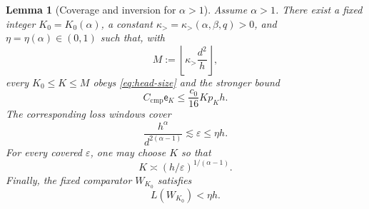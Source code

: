 \documentclass[11pt]{article}
\newtheorem{lemma}[lemma]{Lemma}
\theoremstyle{definition}
\newcommand{\eps}{\varepsilon}
\begin{document}
\begin{lemma}[Coverage and inversion for $\alpha>1$]
\label{lem:above-coverage}
Assume $\alpha>1$.  There exist a fixed integer $K_0=K_0(\alpha)$, a
constant $\kappa_>=\kappa_>(\alpha,\beta,q)>0$, and
$\eta=\eta(\alpha)\in(0,1)$ such that, with
\[
 M:=\left\lfloor\kappa_>\frac{d^2}{h}\right\rfloor,
\]
every $K_0\leq K\leq M$ obeys \eqref{eq:head-size} and the stronger
bound
\begin{equation}
 C_{\mathrm{cmp}}\mathsf e_K
 \leq\frac{c_0}{16}Kp_Kh.
 \label{eq:above-strong-admissible}
\end{equation}
The corresponding loss windows cover
\begin{equation}
 \frac{h^\alpha}{d^{2(\alpha-1)}}\lesssim\eps\leq\eta h.
 \label{eq:above-covered}
\end{equation}
For every covered $\eps$, one may choose $K$ so that
\begin{equation}
 K\asymp(h/\eps)^{1/(\alpha-1)}.
 \label{eq:above-inversion}
\end{equation}
Finally, the fixed comparator $W_{K_0}$ satisfies
\begin{equation}
 L(W_{K_0})<\eta h.
 \label{eq:fixed-head-comparator}
\end{equation}
\end{lemma}
\end{document}
